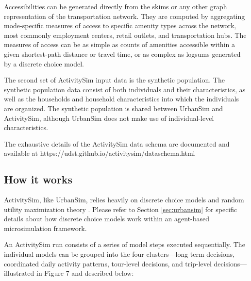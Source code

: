 Accessibilities can be generated directly from the skims or any other graph representation of the transportation network. They are computed by aggregating mode-specific measures of access to specific amenity types across the network, most commonly employment centers, retail outlets, and transportation hubs. The measures of access can be as simple as counts of amenities accessible within a given shortest-path distance or travel time, or as complex as logsums generated by a discrete choice model. 

The second set of ActivitySim input data is the synthetic population. The synthetic population data consist of both individuals and their characteristics, as well as the households and household characteristics into which the individuals are organized. The synthetic population is shared between UrbanSim and ActivitySim, although UrbanSim does not make use of individual-level characteristics. 

The exhaustive details of the ActivitySim data schema are documented and available at https://udst.github.io/activitysim/dataschema.html

\subsection{How it works}

ActivitySim, like UrbanSim, relies heavily on discrete choice models and random utility maximization theory \citep{mcfadden-1974}. Please refer to Section \ref{sec:urbansim} for specific details about how discrete choice models work within an agent-based microsimulation framework.

An ActivitySim run consists of a series of model steps executed sequentially. The individual models can be grouped into the four clusters---long term decisions, coordinated daily activity patterns, tour-level decisions, and trip-level decisions---illustrated in Figure 7 and described below:

